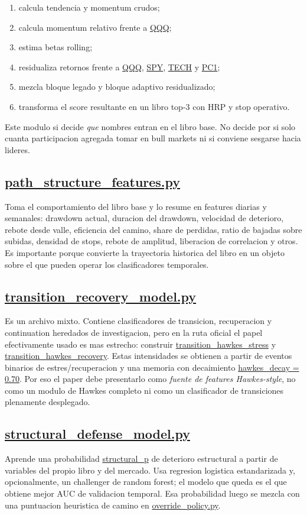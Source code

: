 \documentclass[11pt,letterpaper]{article}
\newcommand{\code}[1]{{\urlstyle{tt}\url{#1}}}
\begin{document}
\begin{enumerate}
    \item calcula tendencia y momentum crudos;
    \item calcula momentum relativo frente a \code{QQQ};
    \item estima betas rolling;
    \item residualiza retornos frente a \code{QQQ}, \code{SPY}, \code{TECH} y \code{PC1};
    \item mezcla bloque legado y bloque adaptivo residualizado;
    \item transforma el score resultante en un libro top-3 con HRP y stop operativo.
\end{enumerate}

Este modulo si decide \emph{que} nombres entran en el libro base. No decide por si solo cuanta participacion agregada tomar en bull markets ni si conviene sesgarse hacia lideres.

\subsection{\code{path_structure_features.py}}
Toma el comportamiento del libro base y lo resume en features diarias y semanales: drawdown actual, duracion del drawdown, velocidad de deterioro, rebote desde valle, eficiencia del camino, share de perdidas, ratio de bajadas sobre subidas, densidad de stops, rebote de amplitud, liberacion de correlacion y otros. Es importante porque convierte la trayectoria historica del libro en un objeto sobre el que pueden operar los clasificadores temporales.

\subsection{\code{transition_recovery_model.py}}
Es un archivo mixto. Contiene clasificadores de transicion, recuperacion y continuation heredados de investigacion, pero en la ruta oficial el papel efectivamente usado es mas estrecho: construir \code{transition_hawkes_stress} y \code{transition_hawkes_recovery}. Estas intensidades se obtienen a partir de eventos binarios de estres/recuperacion y una memoria con decaimiento \code{hawkes_decay = 0.70}. Por eso el paper debe presentarlo como \emph{fuente de features Hawkes-style}, no como un modulo de Hawkes completo ni como un clasificador de transiciones plenamente desplegado.

\subsection{\code{structural_defense_model.py}}
Aprende una probabilidad \code{structural_p} de deterioro estructural a partir de variables del propio libro y del mercado. Usa regresion logistica estandarizada y, opcionalmente, un challenger de random forest; el modelo que queda es el que obtiene mejor AUC de validacion temporal. Esa probabilidad luego se mezcla con una puntuacion heuristica de camino en \code{override_policy.py}.
\end{document}

